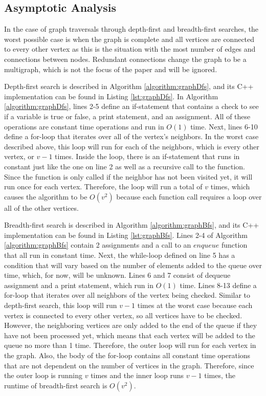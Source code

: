\documentclass[letterpaper, 10pt,DIV=13]{scrartcl}
\numberwithin{equation}{section} %
\numberwithin{figure}{section} %
\numberwithin{table}{section} %
\begin{document}
\subsection{Asymptotic Analysis}
In the case of graph traversals through depth-first and breadth-first searches, the worst possible case is when the graph is complete and all vertices are connected to every other vertex as this is the situation with the most number of edges and connections between nodes. Redundant connections change the graph to be a multigraph, which is not the focus of the paper and will be ignored.

Depth-first search is described in Algorithm \ref{algorithm:graphDfs}, and its C++ implementation can be found in Listing \ref{lst:graphDfs}. In Algorithm \ref{algorithm:graphDfs}, lines 2-5 define an if-statement that contains a check to see if a variable is true or false, a print statement, and an assignment. All of these operations are constant time operations and run in $O(1)$ time. Next, lines 6-10 define a for-loop that iterates over all of the vertex's neighbors. In the worst case described above, this loop will run for each of the neighbors, which is every other vertex, or $v - 1$ times. Inside the loop, there is an if-statement that runs in constant just like the one on line 2 as well as a recursive call to the function. Since the function is only called if the neighbor has not been visited yet, it will run once for each vertex. Therefore, the loop will run a total of $v$ times, which causes the algorithm to be $O(v^2)$ because each function call requires a loop over all of the other vertices.

Breadth-first search is described in Algorithm \ref{algorithm:graphBfs}, and its C++ implementation can be found in Listing \ref{lst:graphBfs}. Lines 2-4 of Algorithm \ref{algorithm:graphBfs} contain 2 assignments and a call to an $enqueue$ function that all run in constant time. Next, the while-loop defined on line 5 has a condition that will vary based on the number of elements added to the queue over time, which, for now, will be unknown. Lines 6 and 7 consist of dequeue assignment and a print statement, which run in $O(1)$ time. Lines 8-13 define a for-loop that iterates over all neighbors of the vertex being checked. Similar to depth-first search, this loop will run $v - 1$ times at the worst case because each vertex is connected to every other vertex, so all vertices have to be checked. However, the neighboring vertices are only added to the end of the queue if they have not been processed yet, which means that each vertex will be added to the queue no more than 1 time. Therefore, the outer loop will run for each vertex in the graph. Also, the body of the for-loop contains all constant time operations that are not dependent on the number of vertices in the graph. Therefore, since the outer loop is running $v$ times and the inner loop runs $v - 1$ times, the runtime of breadth-first search is $O(v^2)$.
\end{document}
